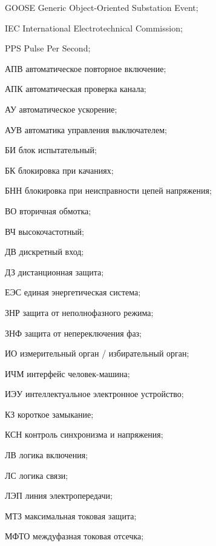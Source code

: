 \begin{list}{}%
{%
  \setlength{\labelwidth}{\abbrwidth}%
  \setlength{\labelsep}{0pt}%
  \setlength{\leftmargin}{\dimexpr\labelwidth+\labelsep\relax}%
  \setlength{\itemindent}{0pt}%
  \setlength{\parsep}{0pt}%
  \setlength{\itemsep}{0pt}
  \renewcommand{\makelabel}[1]{#1 --\hspace{\abbrgap}}%
}
\item[GOOSE] Generic Object-Oriented Substation Event;
\item[IEC]  International Electrotechnical Commission;
\item[PPS] Pulse Per Second;
\item[АПВ] автоматическое повторное включение;
\item[АПК] автоматическая проверка канала;
\item[АУ] автоматическое ускорение;
\item[АУВ] автоматика управления выключателем;
\item[БИ] блок испытательный;
\item[БК] блокировка при качаниях;
\item[БНН] блокировка при неисправности цепей напряжения;
\item[ВО] вторичная обмотка;
\item[ВЧ] высокочастотный;
\item[ДВ] дискретный вход;
\item[ДЗ] дистанционная защита;
\item[ЕЭС] единая энергетическая система;
\item[ЗНР] защита от неполнофазного режима;
\item[ЗНФ] защита от непереключения фаз;
\item[ИО] измерительный орган / избирательный орган;
\item[ИЧМ] интерфейс человек-машина;
\item[ИЭУ] интеллектуальное электронное устройство;
\item[КЗ] короткое замыкание;
\item[КСН] контроль синхронизма и напряжения;
\item[ЛВ] логика включения;
\item[ЛС] логика связи;
\item[ЛЭП] линия электропередачи;
\item[МТЗ] максимальная токовая защита;
\item[МФТО] междуфазная токовая отсечка;

\end{list}
